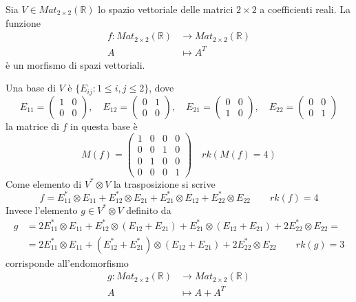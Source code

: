 \documentclass[../main.tex]{subfiles}
\begin{document}
\begin{example}
    Sia $V \in Mat_{2 \times 2}(\mathbb{R})$ lo spazio vettoriale delle matrici $2 \times 2$ a coefficienti reali. La funzione
    \begin{align*}
        f: Mat_{2 \times 2}(\mathbb{R}) & \rightarrow Mat_{2 \times 2}(\mathbb{R}) \\
        A                               & \mapsto A^T
    \end{align*}
    è un morfismo di spazi vettoriali.

    Una base di $V$ è $\{E_{ij} : 1 \leq i,j \leq 2\}$, dove
    \begin{equation*}
        E_{11} = \begin{pmatrix}
            1 & 0 \\
            0 & 0
        \end{pmatrix}, \quad
        E_{12} = \begin{pmatrix}
            0 & 1 \\
            0 & 0
        \end{pmatrix}, \quad
        E_{21} = \begin{pmatrix}
            0 & 0 \\
            1 & 0
        \end{pmatrix}, \quad
        E_{22} = \begin{pmatrix}
            0 & 0 \\
            0 & 1
        \end{pmatrix}
    \end{equation*}
    la matrice di $f$ in questa base è
    \begin{equation*}
        M(f) = \begin{pmatrix}
            1 & 0 & 0 & 0 \\
            0 & 0 & 1 & 0 \\
            0 & 1 & 0 & 0 \\
            0 & 0 & 0 & 1
        \end{pmatrix} \quad rk(M(f) = 4)
    \end{equation*}
    Come elemento di $V^* \otimes V$ la trasposizione si scrive
    \begin{equation*}
        f = E_{11}^* \otimes E_{11} + E_{12}^* \otimes E_{21} + E_{21}^* \otimes E_{12} + E_{22}^* \otimes E_{22} \qquad rk(f) = 4
    \end{equation*}
    Invece l'elemento $g \in V^* \otimes V$ definito da
    \begin{align*}
        g & = 2E_{11}^* \otimes E_{11} + E_{12}^* \otimes (E_{12} + E_{21}) + E_{21}^* \otimes (E_{12} + E_{21}) + 2E_{22}^* \otimes E_{22} = \\
          & = 2E_{11}^* \otimes E_{11} + (E_{12}^* + E_{21}^*) \otimes (E_{12} + E_{21}) + 2E_{22}^* \otimes E_{22} \qquad rk(g) = 3
    \end{align*}
    corrisponde all'endomorfismo
    \begin{align*}
        g: Mat_{2 \times 2}(\mathbb{R}) & \rightarrow Mat_{2 \times 2}(\mathbb{R}) \\
        A                               & \mapsto A + A^T
    \end{align*}
\end{example}
\end{document}
